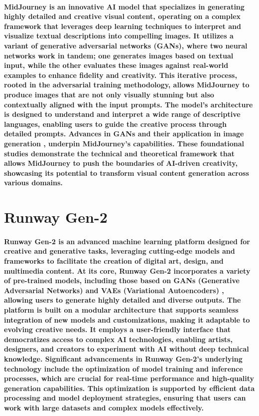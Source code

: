 \documentclass[11pt,a4paper,oneside]{report}
\begin{document}
\paragraph{MidJourney is an innovative AI model that specializes in generating highly detailed and creative visual content, operating on a complex framework that leverages deep learning techniques to interpret and visualize textual descriptions into compelling images. It utilizes a variant of generative adversarial networks (GANs), where two neural networks work in tandem; one generates images based on textual input, while the other evaluates these images against real-world examples to enhance fidelity and creativity. This iterative process, rooted in the adversarial training methodology, allows MidJourney to produce images that are not only visually stunning but also contextually aligned with the input prompts. The model's architecture is designed to understand and interpret a wide range of descriptive languages, enabling users to guide the creative process through detailed prompts. Advances in GANs and their application in image generation \cite{goodfellow2014generative} \cite{karras2019style}, underpin MidJourney's capabilities. These foundational studies demonstrate the technical and theoretical framework that allows MidJourney to push the boundaries of AI-driven creativity, showcasing its potential to transform visual content generation across various domains.}

\section{Runway Gen-2}
\paragraph{Runway Gen-2 is an advanced machine learning platform designed for creative and generative tasks, leveraging cutting-edge models and frameworks to facilitate the creation of digital art, design, and multimedia content. At its core, Runway Gen-2 incorporates a variety of pre-trained models, including those based on GANs (Generative Adversarial Networks) and VAEs (Variational Autoencoders) \cite{kingma2013auto}, allowing users to generate highly detailed and diverse outputs. The platform is built on a modular architecture that supports seamless integration of new models and customizations, making it adaptable to evolving creative needs. It employs a user-friendly interface that democratizes access to complex AI technologies, enabling artists, designers, and creators to experiment with AI without deep technical knowledge. Significant advancements in Runway Gen-2's underlying technology include the optimization of model training and inference processes, which are crucial for real-time performance and high-quality generation capabilities. This optimization is supported by efficient data processing and model deployment strategies, ensuring that users can work with large datasets and complex models effectively.}
\end{document}
